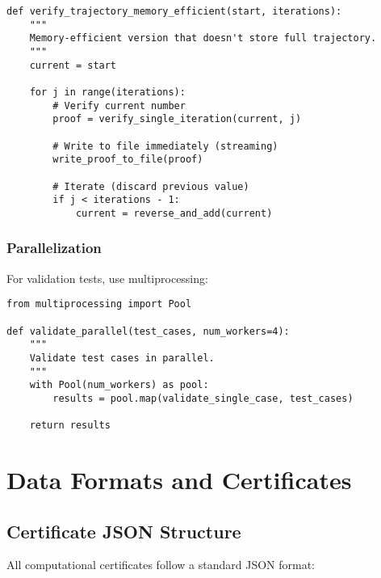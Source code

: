 \documentclass[11pt,a4paper]{article}
\begin{document}
\begin{lstlisting}[style=pythonstyle, caption={Memory-Efficient Mode}]
def verify_trajectory_memory_efficient(start, iterations):
    """
    Memory-efficient version that doesn't store full trajectory.
    """
    current = start
    
    for j in range(iterations):
        # Verify current number
        proof = verify_single_iteration(current, j)
        
        # Write to file immediately (streaming)
        write_proof_to_file(proof)
        
        # Iterate (discard previous value)
        if j < iterations - 1:
            current = reverse_and_add(current)
\end{lstlisting}

\subsubsection{Parallelization}

For validation tests, use multiprocessing:

\begin{lstlisting}[style=pythonstyle, caption={Parallel Validation}]
from multiprocessing import Pool

def validate_parallel(test_cases, num_workers=4):
    """
    Validate test cases in parallel.
    """
    with Pool(num_workers) as pool:
        results = pool.map(validate_single_case, test_cases)
    
    return results
\end{lstlisting}

\section{Data Formats and Certificates}

\subsection{Certificate JSON Structure}

All computational certificates follow a standard JSON format:
\end{document}
